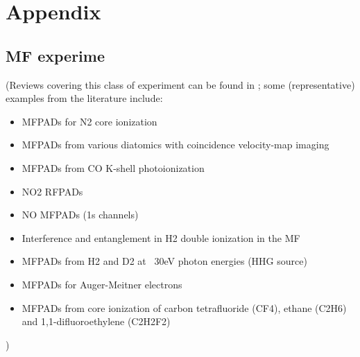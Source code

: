 \section{Appendix}

\subsection{MF experime}

(Reviews covering this class of experiment can be found in  \cite{Yagishita2005,Reid2012,dowek2012PhotoionizationDynamicsPhotoemission,Yagishita2015}; some (representative) examples from the literature include:
\begin{itemize}
\item MFPADs for N2 core ionization \cite{Shigemasa1995}
\item MFPADs from various diatomics with coincidence velocity-map imaging \cite{Eland2000} \cite{Hikosaka2000}
\item MFPADs from CO K-shell photoionization \cite{motoki2000KshellPhotoionizationCO}
\item NO2 RFPADs \cite{Toffoli2007}
\item NO MFPADs (1s channels) \cite{Li2007}
\item Interference and entanglement in H2 double ionization in the MF \cite{Akoury2007}
\item MFPADs from H2 and D2 at ~30eV photon energies (HHG source) \cite{Billaud2012a}
\item MFPADs for Auger-Meitner electrons \cite{Cryan2010,Cryan2012a}
\item MFPADs from core ionization of carbon tetrafluoride (CF4), ethane (C2H6) and 1,1-difluoroethylene (C2H2F2)\cite{Menssen2016}
\end{itemize}

)